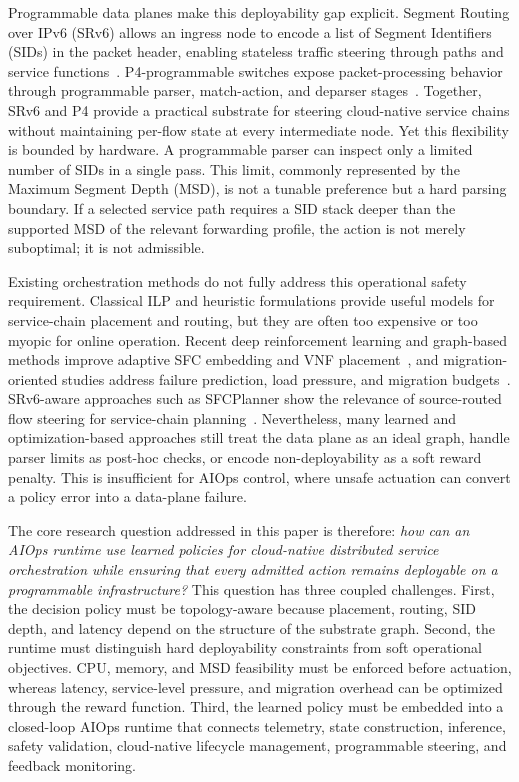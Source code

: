 \documentclass[final,5p]{elsarticle}
\begin{document}
Programmable data planes make this deployability gap explicit. Segment Routing over IPv6 (SRv6) allows an ingress node to encode a list of Segment Identifiers (SIDs) in the packet header, enabling stateless traffic steering through paths and service functions~\cite{filsfils2015segment,rfc8986,rfc9352}. P4-programmable switches expose packet-processing behavior through programmable parser, match-action, and deparser stages~\cite{jeyakumar2014p4}. Together, SRv6 and P4 provide a practical substrate for steering cloud-native service chains without maintaining per-flow state at every intermediate node. Yet this flexibility is bounded by hardware. A programmable parser can inspect only a limited number of SIDs in a single pass. This limit, commonly represented by the Maximum Segment Depth (MSD), is not a tunable preference but a hard parsing boundary. If a selected service path requires a SID stack deeper than the supported MSD of the relevant forwarding profile, the action is not merely suboptimal; it is not admissible.

Existing orchestration methods do not fully address this operational safety requirement. Classical ILP and heuristic formulations provide useful models for service-chain placement and routing, but they are often too expensive or too myopic for online operation. Recent deep reinforcement learning and graph-based methods improve adaptive SFC embedding and VNF placement~\cite{wang2021drl,xiao2023twostage,liu2024sfcml,taktak2024drl,wu2025drl}, and migration-oriented studies address failure prediction, load pressure, and migration budgets~\cite{zhai2023migration,addad2022ai,qin2023sfcmigrationbudget,afrasiabi2024cluster,zhang2025sfcmigration,hu2026rlpmo}. SRv6-aware approaches such as SFCPlanner show the relevance of source-routed flow steering for service-chain planning~\cite{qiu2024sfcplanner}. Nevertheless, many learned and optimization-based approaches still treat the data plane as an ideal graph, handle parser limits as post-hoc checks, or encode non-deployability as a soft reward penalty. This is insufficient for AIOps control, where unsafe actuation can convert a policy error into a data-plane failure.

The core research question addressed in this paper is therefore: \emph{how can an AIOps runtime use learned policies for cloud-native distributed service orchestration while ensuring that every admitted action remains deployable on a programmable infrastructure?} This question has three coupled challenges. First, the decision policy must be topology-aware because placement, routing, SID depth, and latency depend on the structure of the substrate graph. Second, the runtime must distinguish hard deployability constraints from soft operational objectives. CPU, memory, and MSD feasibility must be enforced before actuation, whereas latency, service-level pressure, and migration overhead can be optimized through the reward function. Third, the learned policy must be embedded into a closed-loop AIOps runtime that connects telemetry, state construction, inference, safety validation, cloud-native lifecycle management, programmable steering, and feedback monitoring.
\end{document}
